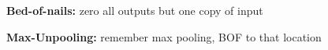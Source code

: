 \textbf{Bed-of-nails:} zero all outputs but one copy of input

\textbf{Max-Unpooling:} remember max pooling, BOF to that location\\

